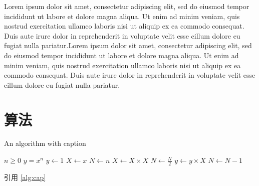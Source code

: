 Lorem ipsum dolor sit amet, consectetur adipiscing elit, sed do eiusmod tempor incididunt ut labore et dolore magna aliqua. Ut enim ad minim veniam, quis nostrud exercitation ullamco laboris nisi ut aliquip ex ea commodo consequat. Duis aute irure dolor in reprehenderit in voluptate velit esse cillum dolore eu fugiat nulla pariatur.Lorem ipsum dolor sit amet, consectetur adipiscing elit, sed do eiusmod tempor incididunt ut labore et dolore magna aliqua. Ut enim ad minim veniam, quis nostrud exercitation ullamco laboris nisi ut aliquip ex ea commodo consequat. Duis aute irure dolor in reprehenderit in voluptate velit esse cillum dolore eu fugiat nulla pariatur.

\section{算法}

\begin{algorithm}
    \caption{An algorithm with caption}\label{alg:cap}
    \begin{algorithmic}
        \Require $n \geq 0$
        \Ensure $y = x^n$
        \State $y \gets 1$
        \State $X \gets x$
        \State $N \gets n$
        \State $X \gets X \times X$
        \State $N \gets \frac{N}{2}$  
        \State $y \gets y \times X$
        \State $N \gets N - 1$
        \EndIf
        \EndWhile
    \end{algorithmic}
\end{algorithm}

引用 \autoref{alg:cap}